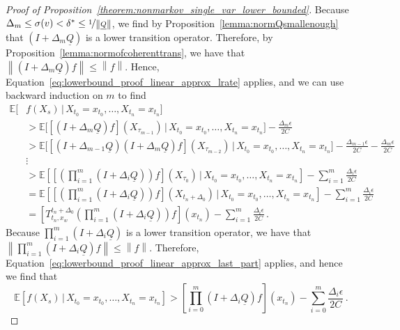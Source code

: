 \documentclass[10pt]{paper}
\theoremstyle{definition}
\newcommand{\lrate}{\underline{Q}}
\newcommand{\norm}[1]{\left\lVert #1 \right\rVert}
\begin{document}
\begin{proof}[Proof of Proposition~\ref{theorem:nonmarkov_single_var_lower_bounded}]
Because $\Delta_m\leq\sigma(v)<\delta^*\leq\nicefrac{1}{\norm{\lrate}}$, we find by Proposition~\ref{lemma:normQsmallenough} that $(I+\Delta_m\lrate)$ is a lower transition operator. Therefore, by Proposition~\ref{lemma:normofcoherenttrans}, we have that $\norm{(I+\Delta_m\lrate)f}\leq\norm{f}$. Hence, Equation~\eqref{eq:lowerbound_proof_linear_approx_lrate} applies, and we can use backward induction on $m$ to find
\begin{align*}
\mathbb{E}[&f(X_s)\,\vert\,X_{t_0}=x_{t_0},\ldots,X_{t_n}=x_{t_n}] \\
& > \mathbb{E}\bigl[[(I+\Delta_m\lrate)f](X_{\tau_{m-1}})\,\vert\,X_{t_0}=x_{t_0},\ldots,X_{t_n}=x_{t_n}\bigr] - \frac{\Delta_{m}\epsilon}{2C} \\
 &> \mathbb{E}\bigl[[(I+\Delta_{m-1}\lrate)(I+\Delta_m\lrate)f](X_{\tau_{m-2}})\,\vert\,X_{t_0}=x_{t_0},\ldots,X_{t_n}=x_{t_n}\bigr] - \frac{\Delta_{m-1}\epsilon}{2C} - \frac{\Delta_{m}\epsilon}{2C} \\
&\vdots \\
& > \mathbb{E}\left[\left[\left(\prod_{i=1}^m(I+\Delta_i\lrate)\right)f\right](X_{\tau_{0}})\,\Bigg\vert\,X_{t_0}=x_{t_0},\ldots,X_{t_n}=x_{t_n}\right] - \sum_{i=1}^m\frac{\Delta_{i}\epsilon}{2C} \\
& = \mathbb{E}\left[\left[\left(\prod_{i=1}^m(I+\Delta_i\lrate)\right)f\right](X_{t_n+\Delta_0})\,\Bigg\vert\,X_{t_0}=x_{t_0},\ldots,X_{t_n}=x_{t_n}\right] - \sum_{i=1}^m\frac{\Delta_{i}\epsilon}{2C} \\
&= \left[T_{t_n,x_w}^{t_n+\Delta_0}\left(\prod_{i=1}^m(I+\Delta_i\lrate)\right)f\right](x_{t_n}) - \sum_{i=1}^m\frac{\Delta_{i}\epsilon}{2C}\,.
\end{align*}
Because $\prod_{i=1}^m(I+\Delta_i\lrate)$ is a lower transition operator, we have that $\norm{\prod_{i=1}^m(I+\Delta_i\lrate)f}\leq\norm{f}$. Therefore, Equation~\eqref{eq:lowerbound_proof_linear_approx_last_part} applies, and hence we find that
\begin{equation*}
\mathbb{E}[f(X_s)\,\vert\,X_{t_0}=x_{t_0},\ldots,X_{t_n}=x_{t_n}] > \left[\prod_{i=0}^m(I+\Delta_i\lrate)f\right](x_{t_n}) - \sum_{i=0}^m\frac{\Delta_{i}\epsilon}{2C}\,.

\end{equation*}
\end{proof}
\end{document}
